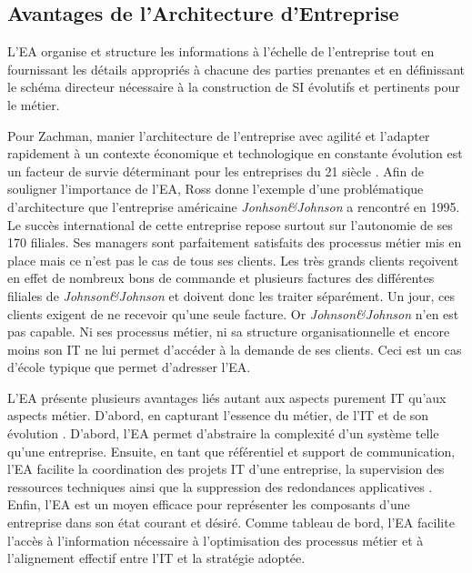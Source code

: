 


\subsection{Avantages de l'Architecture d'Entreprise}
L'EA organise et structure les informations à l'échelle de l'entreprise tout en 
fournissant les détails appropriés à chacune des parties prenantes et en 
définissant le schéma directeur nécessaire à la construction de SI évolutifs et 
pertinents pour le métier. 


Pour Zachman, manier l'architecture de l'entreprise avec agilité et l'adapter 
rapidement à un contexte économique et technologique en constante évolution est 
un 
facteur de survie déterminant pour les entreprises du 21 siècle 
\cite{zachman1997enterprise}. Afin de souligner l'importance de l'EA, Ross 
\cite{rossyoutube} donne l'exemple d'une problématique d'architecture que 
l'entreprise américaine \textit{Jonhson\&Johnson} a rencontré en 1995. Le succès 
international de cette entreprise repose surtout sur l'autonomie de ses 170 
filiales. Ses managers sont parfaitement satisfaits des processus métier mis en 
place mais ce n'est pas le cas de tous ses clients. Les très grands clients 
reçoivent en effet de nombreux bons de commande et plusieurs factures des 
différentes filiales de \textit{Johnson\&Johnson} et doivent donc les traiter 
séparément. 
Un jour, ces clients exigent de ne recevoir qu'une seule facture. Or 
\textit{Johnson\&Johnson} n'en est pas capable. Ni ses processus métier, ni sa 
structure 
organisationnelle et encore moins son IT ne lui permet d'accéder à la 
demande de ses clients. Ceci est un cas d'école typique que permet d'adresser 
l'EA.

L'EA présente plusieurs avantages liés autant aux aspects purement IT qu'aux 
aspects métier. D'abord, en capturant l'essence du métier, de l'IT et de son 
évolution \cite{lankhorst2013enterprise}. D'abord, l'EA permet d'abstraire la 
complexité 
d'un système telle qu'une entreprise. Ensuite, en tant que référentiel et 
support de communication, l'EA facilite la coordination des projets IT d'une 
entreprise, la supervision des ressources techniques ainsi que la suppression 
des redondances applicatives \cite{shah2007frameworks}. Enfin, l'EA est un moyen 
efficace pour représenter les composants d'une entreprise dans son état courant 
et 
désiré. Comme tableau de bord, l'EA facilite l'accès à l'information nécessaire 
à l'optimisation des processus métier et à l'alignement effectif entre l'IT et 
la stratégie adoptée. 

